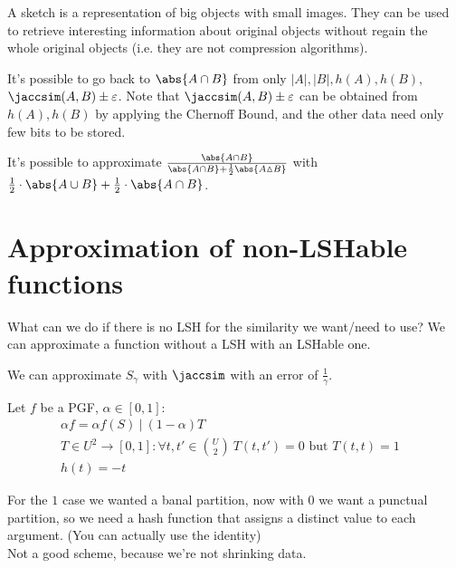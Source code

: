  A sketch is a representation of big objects with small images. They can be used to retrieve interesting information about original objects without regain the whole original objects (i.e. they are not compression algorithms).

\ex It's possible to go back to $\abs{A \cap B}$ from only $|A|, |B|, h(A), h(B),$ $\jaccsim(A,B)\pm\varepsilon$. Note that $\jaccsim(A,B)\pm\varepsilon$ can be obtained from $h(A), h(B)$ by applying the Chernoff Bound, and the other data need only few bits to be stored.

\ex It's possible to approximate $\frac{\abs{A \cap B}}{\abs{A \cap B} + \frac{1}{2}\abs{A \vartriangle B}}$ with
	$\frac{1}{2} \cdot \abs{A \cup B} + \frac{1}{2} \cdot \abs{A \cap B}$.

	
	
	
	
\section{Approximation of non-LSHable functions}

What can we do if there is no LSH for the similarity we want/need to use? We can approximate a function without a LSH with an LSHable one.

\ex \label{ex:appr_1} We can approximate $S_\gamma$ with $\jaccsim$ with an error of $\frac{1}{\gamma}$.

\begin{thm}
	Let $f$ be a PGF, $\alpha \in [0, 1]$:
	\begin{align*}
		& \alpha f = \alpha f(S)\ |\ (1 - \alpha)T &&\\
		& T \in U^2 \to [0, 1] : \forall {t, t'} \in \binom{U}{2} \ T(t, t') = 0 \text{ but } T(t, t) = 1 &&\\
		& h(t)=-t &&
	\end{align*}
\end{thm}

For the $1$ case we wanted a banal partition, now with $0$ we want a punctual partition, so we need a hash function that assigns a distinct value to each argument. (You can actually use the identity) \\
Not a good scheme, because we're not shrinking data.

